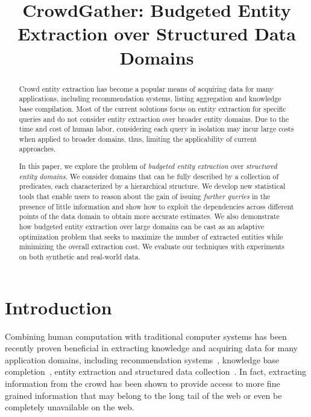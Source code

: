 \documentclass{sig-alternate}
\begin{document}

\title{CrowdGather: Budgeted Entity Extraction over Structured Data Domains}


\author{
}

\maketitle

\begin{abstract}
Crowd entity extraction has become a popular means of acquiring data for many applications, including recommendation systems, listing aggregation and knowledge base compilation.  Most of the current solutions focus on entity extraction for specific queries and do not consider entity extraction over broader entity domains. Due to the time and cost of human labor, considering each query in isolation may incur large costs when applied to broader domains, thus, limiting the applicability of current approaches.
 
In this paper, we explore the problem of {\em budgeted entity extraction} over {\em structured entity domains}. We consider domains that can be fully described by a collection of predicates, each characterized by a hierarchical structure. We develop new statistical tools that enable users to reason about the gain of issuing {\em further queries} in the presence of little information and show how to exploit the dependencies across different points of the data domain to obtain more accurate estimates. We also demonstrate how budgeted entity extraction over large domains can be cast as an adaptive optimization problem that seeks to maximize the number of extracted entities while minimizing the overall extraction cost. We evaluate our techniques with experiments on both synthetic and real-world data. 
\end{abstract}

\section{Introduction}
Combining human computation with traditional computer systems has been recently proven beneficial in extracting knowledge and acquiring data for many application domains, including recommendation systems~\cite{amsterdamer:2014}, knowledge base completion~\cite{kondredi:2014, west:2014}, entity extraction and structured data collection~\cite{trushkowsky:2013, park:2014}. In fact, extracting information from the crowd has been shown to provide access to more fine grained information that may belong to the long tail of the web or even be completely unavailable on the web.
\end{document}
